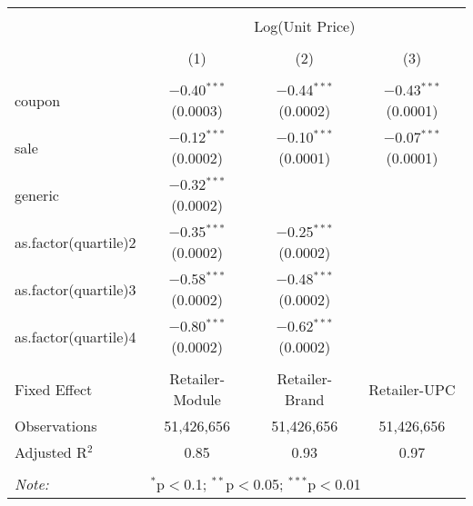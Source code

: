
\begin{table}[!htbp] \centering 
  \caption{} 
  \label{tab:overallSavings} 
\begin{tabular}{@{\extracolsep{5pt}}lccc} 
\\[-1.8ex]\hline 
\hline \\[-1.8ex] 
 & \multicolumn{3}{c}{Log(Unit Price)} \\ 
\\[-1.8ex] & (1) & (2) & (3)\\ 
\hline \\[-1.8ex] 
 coupon & $-$0.40$^{***}$ (0.0003) & $-$0.44$^{***}$ (0.0002) & $-$0.43$^{***}$ (0.0001) \\ 
  sale & $-$0.12$^{***}$ (0.0002) & $-$0.10$^{***}$ (0.0001) & $-$0.07$^{***}$ (0.0001) \\ 
  generic & $-$0.32$^{***}$ (0.0002) &  &  \\ 
  as.factor(quartile)2 & $-$0.35$^{***}$ (0.0002) & $-$0.25$^{***}$ (0.0002) &  \\ 
  as.factor(quartile)3 & $-$0.58$^{***}$ (0.0002) & $-$0.48$^{***}$ (0.0002) &  \\ 
  as.factor(quartile)4 & $-$0.80$^{***}$ (0.0002) & $-$0.62$^{***}$ (0.0002) &  \\ 
 \hline \\[-1.8ex] 
Fixed Effect & Retailer-Module & Retailer-Brand & Retailer-UPC \\ 
Observations & 51,426,656 & 51,426,656 & 51,426,656 \\ 
Adjusted R$^{2}$ & 0.85 & 0.93 & 0.97 \\ 
\hline 
\hline \\[-1.8ex] 
\textit{Note:}  & \multicolumn{3}{l}{$^{*}$p$<$0.1; $^{**}$p$<$0.05; $^{***}$p$<$0.01} \\ 
\end{tabular} 
\end{table} 
